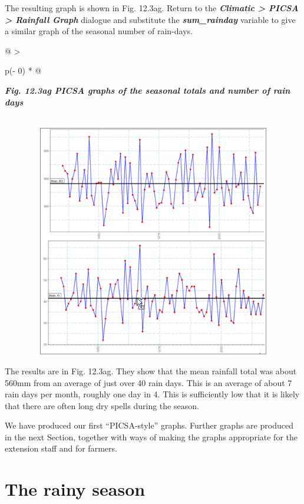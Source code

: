 \documentclass[
  letterpaper,
  DIV=11,
  numbers=noendperiod]{scrreprt}
\begin{document}
The resulting graph is shown in Fig. 12.3ag. Return to the
\textbf{\emph{Climatic \textgreater{} PICSA \textgreater{} Rainfall
Graph}} dialogue and substitute the \textbf{\emph{sum\_rainday}}
variable to give a similar graph of the seasonal number of rain-days.

\begin{longtable}[]{@{}
  >{\raggedright\arraybackslash}p{(\columnwidth - 0\tabcolsep) * }@{}}
\toprule\noalign{}
\begin{minipage}[b]{\linewidth}\raggedright
\textbf{\emph{Fig. 12.3ag PICSA graphs of the seasonal totals and number
of rain days}}
\end{minipage} \\
\midrule\noalign{}
\endhead
\bottomrule\noalign{}
\endlastfoot
\includegraphics[width=5.7214in,height=4.00612in]{figures/Fig12.3ag.png} \\
\end{longtable}

The results are in Fig. 12.3ag. They show that the mean rainfall total
was about 560mm from an average of just over 40 rain days. This is an
average of about 7 rain days per month, roughly one day in 4. This is
sufficiently low that it is likely that there are often long dry spells
during the season.

We have produced our first ``PICSA-style'' graphs. Further graphs are
produced in the next Section, together with ways of making the graphs
appropriate for the extension staff and for farmers.

\section{The rainy season}\label{the-rainy-season}
\end{document}
